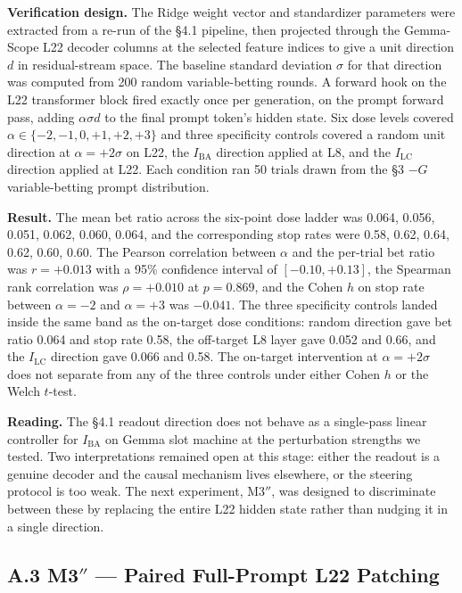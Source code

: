 \documentclass[11pt,a4paper]{article}
\begin{document}
\textbf{Verification design.} The Ridge weight vector and standardizer parameters were extracted from a re-run of the \S4.1 pipeline, then projected through the Gemma-Scope L22 decoder columns at the selected feature indices to give a unit direction $d$ in residual-stream space. The baseline standard deviation $\sigma$ for that direction was computed from 200 random variable-betting rounds. A forward hook on the L22 transformer block fired exactly once per generation, on the prompt forward pass, adding $\alpha \sigma d$ to the final prompt token's hidden state. Six dose levels covered $\alpha \in \{-2, -1, 0, +1, +2, +3\}$ and three specificity controls covered a random unit direction at $\alpha = +2\sigma$ on L22, the $I_\text{BA}$ direction applied at L8, and the $I_\text{LC}$ direction applied at L22. Each condition ran 50 trials drawn from the \S3 $-G$ variable-betting prompt distribution.

\textbf{Result.} The mean bet ratio across the six-point dose ladder was 0.064, 0.056, 0.051, 0.062, 0.060, 0.064, and the corresponding stop rates were 0.58, 0.62, 0.64, 0.62, 0.60, 0.60. The Pearson correlation between $\alpha$ and the per-trial bet ratio was $r = +0.013$ with a 95\% confidence interval of $[-0.10, +0.13]$, the Spearman rank correlation was $\rho = +0.010$ at $p = 0.869$, and the Cohen $h$ on stop rate between $\alpha = -2$ and $\alpha = +3$ was $-0.041$. The three specificity controls landed inside the same band as the on-target dose conditions: random direction gave bet ratio 0.064 and stop rate 0.58, the off-target L8 layer gave 0.052 and 0.66, and the $I_\text{LC}$ direction gave 0.066 and 0.58. The on-target intervention at $\alpha = +2\sigma$ does not separate from any of the three controls under either Cohen $h$ or the Welch $t$-test.

\textbf{Reading.} The \S4.1 readout direction does not behave as a single-pass linear controller for $I_\text{BA}$ on Gemma slot machine at the perturbation strengths we tested. Two interpretations remained open at this stage: either the readout is a genuine decoder and the causal mechanism lives elsewhere, or the steering protocol is too weak. The next experiment, M3$''$, was designed to discriminate between these by replacing the entire L22 hidden state rather than nudging it in a single direction.

\subsection*{A.3 M3$''$ --- Paired Full-Prompt L22 Patching}
\end{document}
